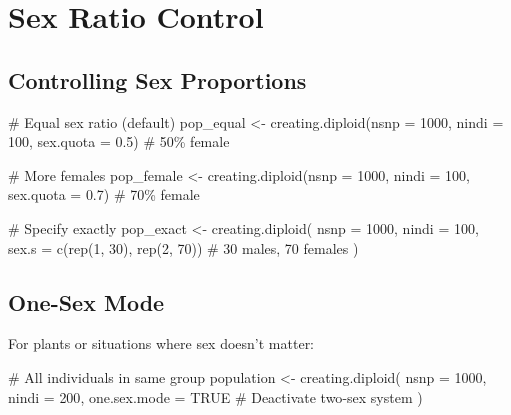 \documentclass[
  letterpaper,
]{book}
\newenvironment{Shaded}{\begin{snugshade}}{\end{snugshade}}
\newcommand{\AttributeTok}[1]{\textcolor[rgb]{0.40,0.45,0.13}{#1}}
\newcommand{\CommentTok}[1]{\textcolor[rgb]{0.37,0.37,0.37}{#1}}
\newcommand{\ConstantTok}[1]{\textcolor[rgb]{0.56,0.35,0.01}{#1}}
\newcommand{\DecValTok}[1]{\textcolor[rgb]{0.68,0.00,0.00}{#1}}
\newcommand{\FloatTok}[1]{\textcolor[rgb]{0.68,0.00,0.00}{#1}}
\newcommand{\FunctionTok}[1]{\textcolor[rgb]{0.28,0.35,0.67}{#1}}
\newcommand{\NormalTok}[1]{\textcolor[rgb]{0.00,0.23,0.31}{#1}}
\newcommand{\OtherTok}[1]{\textcolor[rgb]{0.00,0.23,0.31}{#1}}
\begin{document}
\section{Sex Ratio Control}\label{sec-sex-control}

\subsection{Controlling Sex
Proportions}\label{controlling-sex-proportions}

\begin{Shaded}
\begin{Highlighting}[]
\CommentTok{\# Equal sex ratio (default)}
\NormalTok{pop\_equal }\OtherTok{\textless{}{-}} \FunctionTok{creating.diploid}\NormalTok{(}\AttributeTok{nsnp =} \DecValTok{1000}\NormalTok{, }\AttributeTok{nindi =} \DecValTok{100}\NormalTok{,}
                               \AttributeTok{sex.quota =} \FloatTok{0.5}\NormalTok{)  }\CommentTok{\# 50\% female}

\CommentTok{\# More females}
\NormalTok{pop\_female }\OtherTok{\textless{}{-}} \FunctionTok{creating.diploid}\NormalTok{(}\AttributeTok{nsnp =} \DecValTok{1000}\NormalTok{, }\AttributeTok{nindi =} \DecValTok{100}\NormalTok{,}
                                \AttributeTok{sex.quota =} \FloatTok{0.7}\NormalTok{)  }\CommentTok{\# 70\% female}

\CommentTok{\# Specify exactly}
\NormalTok{pop\_exact }\OtherTok{\textless{}{-}} \FunctionTok{creating.diploid}\NormalTok{(}
  \AttributeTok{nsnp =} \DecValTok{1000}\NormalTok{,}
  \AttributeTok{nindi =} \DecValTok{100}\NormalTok{,}
  \AttributeTok{sex.s =} \FunctionTok{c}\NormalTok{(}\FunctionTok{rep}\NormalTok{(}\DecValTok{1}\NormalTok{, }\DecValTok{30}\NormalTok{), }\FunctionTok{rep}\NormalTok{(}\DecValTok{2}\NormalTok{, }\DecValTok{70}\NormalTok{))  }\CommentTok{\# 30 males, 70 females}
\NormalTok{)}
\end{Highlighting}
\end{Shaded}

\subsection{One-Sex Mode}\label{one-sex-mode-1}

For plants or situations where sex doesn't matter:

\begin{Shaded}
\begin{Highlighting}[]
\CommentTok{\# All individuals in same group}
\NormalTok{population }\OtherTok{\textless{}{-}} \FunctionTok{creating.diploid}\NormalTok{(}
  \AttributeTok{nsnp =} \DecValTok{1000}\NormalTok{,}
  \AttributeTok{nindi =} \DecValTok{200}\NormalTok{,}
  \AttributeTok{one.sex.mode =} \ConstantTok{TRUE}  \CommentTok{\# Deactivate two{-}sex system}
\NormalTok{)}
\end{Highlighting}
\end{Shaded}
\end{document}
